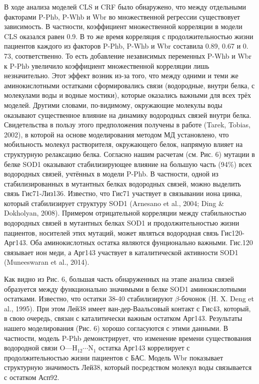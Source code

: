 В ходе анализа моделей CLS и CRF было обнаружено, что между отдельными факторами P-Phb, P-Whb и Wbr во множественной регрессии существовует зависимость. В частности, коэффициент множественной корреляции в модели CLS оказался равен 0.9. В то же время корреляция с продолжительностью жизни пациентов каждого из факторов P-Phb, P-Whb и Wbr составила 0.89, 0.67 и 0. 73, соответственно. То есть добавление независимых переменных P-Whb и Wbr к P-Phb увеличило коэффициент множественной корреляции лишь незначительно. Этот эффект возник из-за того, что между одними и теми же аминокислотными остатками сформировались связи (водородные, внутри белка, с молекулами воды и водные мостики), которые оказались важными для всех трёх моделей. Другими словами, по-видимому, окружающие молекулы воды оказывают существенное влияние на динамику водородных связей внутри белка. Свидетельства в пользу этого предположения получены в работе (Tarek, Tobias, 2002), в которой на основе моделирования методом МД установлено, что мобильность молекул растворителя, окружающего белок, напрямую влияет на структурную релаксацию белка. 
Согласно нашим расчетам (см. Рис. 6) мутации в белке SOD1 оказывают стабилизирующее влияние на большую часть (94\%) всех водородных связей, учтённых в модели P-Phb. В частности, одной из стабилизированных в мутантных белках водородных связей, можно выделить связь Гис71-Лиз136. Известно, что Гис71 участвует в связывании иона цинка, который стабилизирует структуру SOD1 (Arnesano et al., 2004; Ding \& Dokholyan, 2008). Примером отрицательной корреляции между стабильностью водородных связей в мутантных белках SOD1 и продолжительностью жизни пациентов, носителей этих мутаций, может являться водородная связь Гис120-Арг143. Оба аминокислотных остатка являются фунционально важными. Гис.120 связывает ион меди, а Арг143 участвует в каталитической активности SOD1 (Muneeswaran et al., 2014).

Как видно из Рис. 6, большая часть обнаруженных на этапе анализа связей образуется между функционально значимыми в белке SOD1 аминокислотными остатками. Известно, что остатки 38-40 стабилизируют $\beta$-бочонок (H. X. Deng et al., 1995). При этом Лей38 имеет ван-дер-Ваальсовый контакт с Гис43, который, в свою очередь, связан с каталитически важным остатком Арг143. Результаты нашего моделирования (Рис. 6) хорошо согласуются с этими данными. В частности, модель P-Phb демонстрирует, что изменение времени существования водородной связи $\text{O---}\text{H}_{12}\cdots\text{N}_1$ остатка Арг143 коррелирует с продолжительностью жизни пациентов с БАС. Модель Wbr показывает структурную значимость Лей38, который посредством молекул воды связывается с остатком Асп92.

